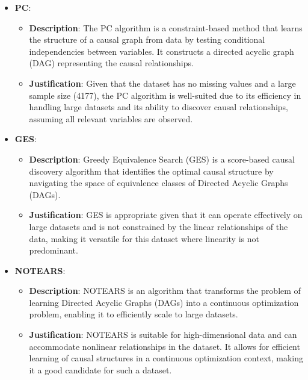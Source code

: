 \documentclass{article}
\begin{document}
\begin{itemize}
    \item \textbf{PC}:
    \begin{itemize}
        \item \textbf{Description}: The PC algorithm is a constraint-based method that learns the structure of a causal graph from data by testing conditional independencies between variables. It constructs a directed acyclic graph (DAG) representing the causal relationships.
        \item \textbf{Justification}: Given that the dataset has no missing values and a large sample size (4177), the PC algorithm is well-suited due to its efficiency in handling large datasets and its ability to discover causal relationships, assuming all relevant variables are observed.
    \end{itemize}
    
    \item \textbf{GES}:
    \begin{itemize}
        \item \textbf{Description}: Greedy Equivalence Search (GES) is a score-based causal discovery algorithm that identifies the optimal causal structure by navigating the space of equivalence classes of Directed Acyclic Graphs (DAGs).
        \item \textbf{Justification}: GES is appropriate given that it can operate effectively on large datasets and is not constrained by the linear relationships of the data, making it versatile for this dataset where linearity is not predominant.
    \end{itemize}
    
    \item \textbf{NOTEARS}:
    \begin{itemize}
        \item \textbf{Description}: NOTEARS is an algorithm that transforms the problem of learning Directed Acyclic Graphs (DAGs) into a continuous optimization problem, enabling it to efficiently scale to large datasets.
        \item \textbf{Justification}: NOTEARS is suitable for high-dimensional data and can accommodate nonlinear relationships in the dataset. It allows for efficient learning of causal structures in a continuous optimization context, making it a good candidate for such a dataset.
    \end{itemize}
    
\end{itemize}
\end{document}
